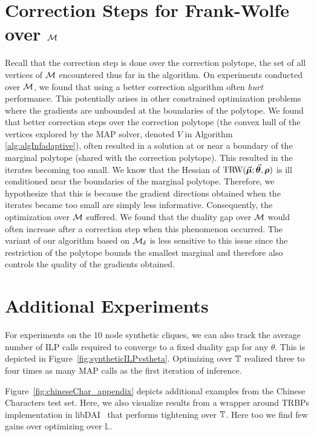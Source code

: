%
%
%
%
%
%
%
%
%
%
%
%
%
%



%
\section{Correction Steps for Frank-Wolfe over $\mathcal{M}$}
Recall that the correction step is done over the correction polytope, 
the set of all vertices of $\mathcal{M}$ encountered thus far in the algorithm.
On experiments conducted over $\mathcal{M}$, we found that using a better correction algorithm often \emph{hurt} performance.
This potentially arises in other constrained optimization problems
where the gradients are unbounded at the boundaries of the polytope. We found that better correction steps
over the correction polytope (the convex hull of the vertices explored by the MAP solver, denoted $V$ in Algorithm \ref{alg:algInfadaptive}), often resulted in a solution at or near a boundary of the marginal polytope (shared
with the correction polytope).
This resulted in the iterates becoming too small. We know that the Hessian of $\text{TRW}(\vec{\bm{\mu}};\vec{\bm{\theta}},\bm{\rho})$ is ill conditioned
near the boundaries of the marginal polytope. Therefore, we hypothesize that this is because the 
gradient directions obtained
when the iterates became too small are simply less informative.
Consequently, the optimization over $\mathcal{M}$ suffered. We found that the duality gap over $\mathcal{M}$ 
would often increase after a correction step when this phenomenon occurred.
The variant of our algorithm based on $\mathcal{M}_{\delta}$ is less sensitive to this issue since the restriction 
of the polytope bounds the smallest marginal and therefore also controls the quality of the gradients obtained.

\section{Additional Experiments}

For experiments on the $10$ node synthetic cliques, we can also track the average number of ILP calls required to converge to a fixed 
duality gap
for any $\theta$. This is depicted in Figure~\ref{fig:syntheticILPvstheta}. 
Optimizing over $\mathbb{T}$ realized three to four times as many MAP calls as the first iteration of inference. 

Figure~\ref{fig:chineseChar_appendix} depicts additional examples from the Chinese Characters test set. Here, we also visualize results
from a wrapper around TRBPs implementation in libDAI~\citep{Mooij_libDAI_10} that performs tightening over $\mathbb{T}$. 
Here too we find few gains over optimizing over $\mathbb{L}$.

